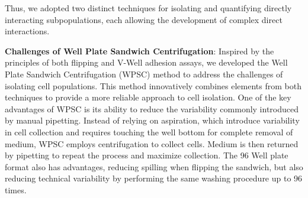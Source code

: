 Thus, we adopted two distinct techniques for isolating and quantifying directly
interacting subpopulations, each allowing the development of complex direct
interactions.












\textbf{Challenges of Well Plate Sandwich Centrifugation}: Inspired by the
principles of both flipping and V-Well adhesion assays, we developed the Well
Plate Sandwich Centrifugation (\acf{WPSC}) method to address the challenges of
isolating cell populations. This method innovatively combines elements from both
techniques to provide a more reliable approach to cell isolation. One of the key
advantages of WPSC is its ability to reduce the variability commonly introduced
by manual pipetting. Instead of relying on aspiration, which introduce
variability in cell collection and requires touching the well bottom for
complete removal of medium, WPSC employs centrifugation to collect cells. Medium
is then returned by pipetting to repeat the process and maximize \nMAina
collection. The 96 Well plate format also has advantages, reducing spilling when
flipping the sandwich, but also reducing technical variability by performing the
same washing procedure up to 96 times.

